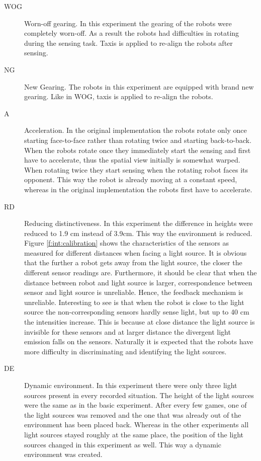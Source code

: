 \begin{description}
\item[WOG] Worn-off gearing. In this experiment the gearing of the robots were completely worn-off. As a result the robots had difficulties in rotating during the sensing task. Taxis is applied to re-align the robots after sensing.

\item[NG] New Gearing. The robots in this experiment are equipped with brand new gearing. Like in WOG, taxis is applied to re-align the robots. 

\item[A] Acceleration. In the original implementation the robots rotate only once starting face-to-face \citep{steelsvogt:1997} rather than rotating twice and starting back-to-back. When the robots rotate once they immediately start the sensing and first have to accelerate, thus the spatial view initially is somewhat warped. When rotating twice they start sensing when the rotating robot faces its opponent. This way the robot is already moving at a constant speed, whereas in the original implementation the robots first have to accelerate.

\item[RD] Reducing distinctiveness. In this experiment the difference in heights were reduced to 1.9 cm instead of 3.9cm. This way the environment is reduced. Figure \ref{f:int:calibration} shows the characteristics of the sensors as measured for different distances when facing a light source. It is obvious that the further a robot gets away from the light source, the closer the different sensor readings are. Furthermore, it should be clear that when the distance between robot and light source is larger, correspondence between sensor and light source is unreliable. Hence, the feedback mechanism is unreliable. Interesting to see is that when the robot is close to the light source the non-corresponding sensors hardly sense light, but up to 40 cm the intensities increase. This is because at close distance the light source is invisible for these sensors and at larger distance the divergent light emission falls on the sensors. Naturally it is expected that the robots have more difficulty in discriminating and identifying the light sources.

\item[DE] Dynamic environment. In this experiment there were only three light sources present in every recorded situation. The height of the light sources were the same as in the basic experiment. After every few games, one of the light sources was removed and the one that was already out of the environment has been placed back. Whereas in the other experiments all light sources stayed roughly at the same place, the position of the light sources changed in this experiment as well. This way a dynamic environment was created.
\end{description}


